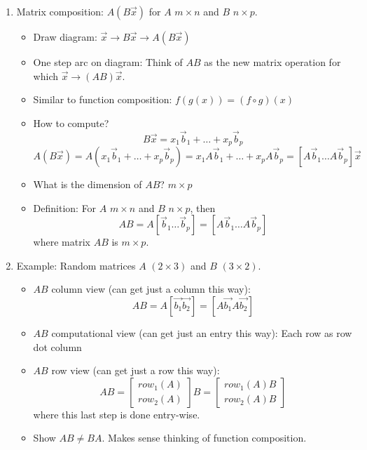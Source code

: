 \documentclass{article}
\begin{document}
\begin{enumerate}
\begin{enumerate}
\item Matrix composition: $A(B\vec{x})$ for $A$ $m \times n$ and $B$ $n \times p$.
\begin{itemize}
\item Draw diagram: $\vec{x} \rightarrow B\vec{x} \rightarrow A(B\vec{x})$
\item One step arc on diagram: Think of $AB$ as the new matrix operation for which $\vec{x} \rightarrow (AB)\vec{x}$.
\item Similar to function composition: $f(g(x)) = (f \circ g)(x)$
\item How to compute?
\[
B \vec{x} = x_1 \vec{b}_1 + \dots + x_p \vec{b}_p
\]
\[ A(B\vec{x}) 
= A(x_1 \vec{b}_1 + \dots + x_p \vec{b}_p) 
= x_1 A\vec{b}_1 + \dots + x_p A\vec{b}_p
= [A\vec{b}_1 \dots A\vec{b}_p] \vec{x}
\]
\item What is the dimension of $AB$? $m \times p$
\item Definition: For $A$ $m \times n$ and $B$ $n \times p$, then
\[
AB = A[\vec{b}_1 \dots \vec{b}_p] = [A\vec{b}_1 \dots A\vec{b}_p]
\]
where matrix $AB$ is $m \times p$.
\end{itemize}

\item Example: Random matrices $A$ $(2\times 3)$ and $B$ $(3 \times 2)$.
\begin{itemize}
\item $AB$ column view (can get just a column this way): 
\[
AB = A [\vec{b_1} \vec{b_2}] = [A\vec{b_1} A\vec{b_2}] 
\]
\item $AB$ computational view (can get just an entry this way): Each row as row dot column
\item $AB$ row view (can get just a row this way): 
\[
AB = \left[
\begin{array}{c}
row_1(A) \\
row_2(A)
\end{array} \right] B 
= \left[
\begin{array}{c}
row_1(A)B \\
row_2(A)B
\end{array} \right]
\]
where this last step is done entry-wise.
\item Show $AB \neq BA$. Makes sense thinking of function composition.
\end{itemize}
\end{enumerate}


\end{enumerate}
\end{document}
